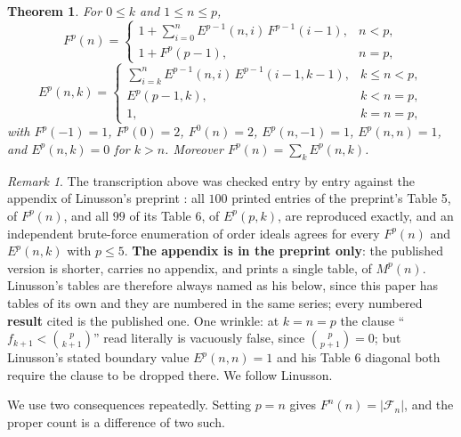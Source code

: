 \documentclass[11pt, a4paper, abstract=yes]{scrartcl}
\theoremstyle{definition}
\theoremstyle{remark}
\newtheorem{remark}[definition]{Remark}
\theoremstyle{plain}
\newtheorem{theorem}[definition]{Theorem}
\begin{document}
\begin{theorem}
\textcite[Theorem 3.2]{Linusson1999} For \(0\le k\) and \(1\le n\le p\),
\begin{equation}\label{eq:auto-8}
  F^p(n)=\begin{cases}
    1+\sum_{i=0}^{n}E^{p-1}(n,i)\,F^{p-1}(i-1), & n<p,\\
    1+F^p(p-1), & n=p,
  \end{cases}
\end{equation}
\begin{equation}\label{eq:auto-9}
  E^p(n,k)=\begin{cases}
    \sum_{i=k}^{n}E^{p-1}(n,i)\,E^{p-1}(i-1,k-1), & k\le n<p,\\
    E^p(p-1,k), & k<n=p,\\
    1, & k=n=p,
  \end{cases}
\end{equation}
with \(F^p(-1)=1\), \(F^p(0)=2\), \(F^0(n)=2\), \(E^p(n,-1)=1\), \(E^p(n,n)=1\), and
\(E^p(n,k)=0\) for \(k>n\). Moreover \(F^p(n)=\sum_kE^p(n,k)\).
\label{thm-linusson}
\end{theorem}

\begin{remark}
The transcription above was checked entry by entry against the appendix of Linusson's preprint
\autocite{Linusson1999preprint}: all \(100\)
printed entries of the preprint's Table 5, of \(F^p(n)\), and all \(99\) of its Table 6, of
\(E^p(p,k)\), are
reproduced exactly, and an
independent brute-force enumeration of order ideals agrees for every \(F^p(n)\) and
\(E^p(n,k)\) with \(p\le5\). \textbf{The appendix is in the preprint only}: the published version is
shorter, carries no appendix, and prints a single table, of \(M^p(n)\). Linusson's tables are
therefore always named as his below, since this paper has tables of its own and they are numbered
in the same series; every numbered \textbf{result} cited is the published one. One wrinkle: at \(k=n=p\) the clause
``\(f_{k+1}<\binom p{k+1}\)'' read literally is vacuously false, since \(\binom p{p+1}=0\); but
Linusson's stated boundary value \(E^p(n,n)=1\) and his Table 6 diagonal both require the clause to
be dropped there. We follow Linusson.
\label{rem-transcription}
\end{remark}

We use two consequences repeatedly. Setting \(p=n\) gives \(F^n(n)=|\mathcal F_n|\), and the
proper count is a difference of two such.
\end{document}

